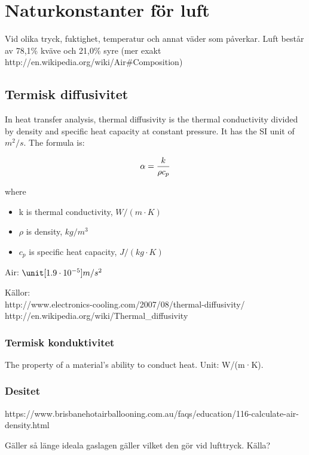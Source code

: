 \section{Naturkonstanter för luft}

Vid olika tryck, fuktighet, temperatur och annat väder som påverkar. Luft består av 78,1\% kväve och 21,0\% syre (mer exakt http://en.wikipedia.org/wiki/Air\#Composition)

\subsection{Termisk diffusivitet}
In heat transfer analysis, thermal diffusivity is the thermal conductivity divided by density and specific heat capacity at constant pressure. It has the SI unit of $m^2/s$. The formula is:

\begin{equation}
\alpha = {k \over {\rho c_p}}
\end{equation}

where
\begin{itemize}
   \item[] k is thermal conductivity, $\unit{W/(m·K)}$
   \item[] $\rho$ is density, $\unit{kg/m^3}$
   \item[] $c_p$ is specific heat capacity, $\unit{J/(kg·K)}$
\end{itemize}

Air: $\unit[1.9\cdot10^{-5}]{m/s^2}$

Källor:\\
http://www.electronics-cooling.com/2007/08/thermal-diffusivity/\\
http://en.wikipedia.org/wiki/Thermal\_diffusivity\\

\subsubsection{Termisk konduktivitet}
The property of a material's ability to conduct heat. Unit: W/(m·K).

\subsubsection{Desitet}

https://www.brisbanehotairballooning.com.au/faqs/education/116-calculate-air-density.html

Gäller så länge ideala gaslagen gäller vilket den gör vid lufttryck. Källa?





